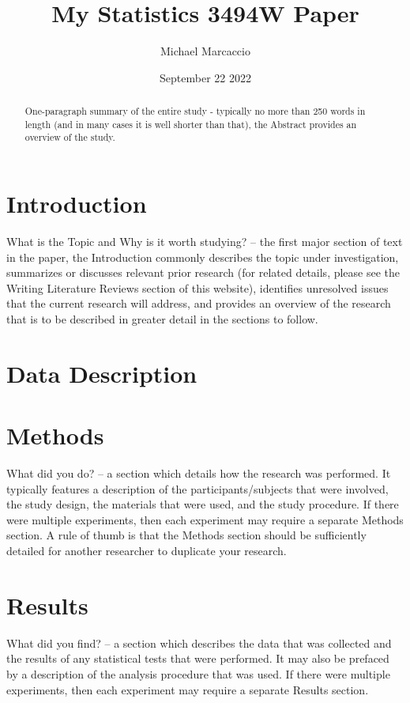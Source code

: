 \documentclass[12pt]{article}
\title{My Statistics 3494W Paper}
\author{Michael  Marcaccio}
\date{September 22 2022}
\begin{document}
\maketitle

\begin{abstract}
  One-paragraph summary of the entire study - typically no more than 250 words in length (and in many cases it is well shorter than that), the Abstract provides an overview of the study.
  \end{abstract}

\section*{Introduction}
What is the Topic and Why is it worth studying? – the first major section of text in the paper, the Introduction commonly describes the topic under investigation, summarizes or discusses relevant prior research (for related details, please see the Writing Literature Reviews section of this website), identifies unresolved issues that the current research will address, and provides an overview of the research that is to be described in greater detail in the sections to follow.

\section*{Data Description}


\section*{Methods}
What did you do? – a section which details how the research was performed.  It typically features a description of the participants/subjects that were involved, the study design, the materials that were used, and the study procedure.  If there were multiple experiments, then each experiment may require a separate Methods section.  A rule of thumb is that the Methods section should be sufficiently detailed for another researcher to duplicate your research.


\section*{Results}
What did you find? – a section which describes the data that was collected and the results of any statistical tests that were performed.  It may also be prefaced by a description of the analysis procedure that was used. If there were multiple experiments, then each experiment may require a separate Results section.
\end{document}
